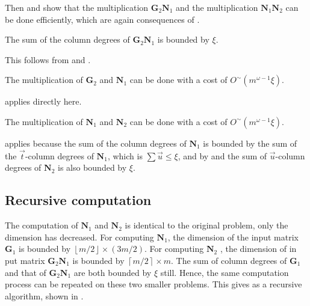 Then  and 
show that the multiplication $\mathbf{G}_{2}\mathbf{N}_{1}$ and the
multiplication $\mathbf{N}_{1}\mathbf{N}_{2}$ can be done efficiently,
which are again consequences of .
\begin{lem}
\label{lem:sizeOfG2N1}The sum of the column degrees of $\mathbf{G}_{2}\mathbf{N}_{1}$
is bounded by $\xi$.\end{lem}
\begin{pf}
This follows from 
and .\end{pf}
\begin{lem}
\label{lem:mutiplyingG2N1}The multiplication of $\mathbf{G}_{2}$
and $\mathbf{N}_{1}$ can be done with a cost of $O^{\sim}(m^{\omega-1}\xi)$.\end{lem}
\begin{pf}
 applies directly here.\end{pf}
\begin{lem}
\label{lem:multiplyingN1N2}The multiplication of $\mathbf{N}_{1}$
and $\mathbf{N}_{2}$ can be done with a cost of $O^{\sim}(m^{\omega-1}\xi)$.\end{lem}
\begin{pf}
 applies because the sum
of the column degrees of $\mathbf{N}_{1}$ is bounded by the sum of
the $\vec{t}$-column degrees of $\mathbf{N}_{1}$, which is $\sum\vec{u}\le\xi$,
and by  and 
the sum of $\vec{u}$-column degrees of $\mathbf{N}_{2}$ is also
bounded by $\xi$.
\end{pf}

\subsection{Recursive computation}

The computation of $\mathbf{N}_{1}$ and $\mathbf{N}_{2}$ is identical
to the original problem, only the dimension has decreased. For computing
$\mathbf{N}_{1}$, the dimension of the input matrix $\mathbf{G}_{1}$
is bounded by $\left\lfloor m/2\right\rfloor \times\left(3m/2\right)$.
For computing $\mathbf{N}_{2}$ , the dimension of in put matrix $\mathbf{G}_{2}\mathbf{N}_{1}$
is bounded by $\left\lceil m/2\right\rceil \times m$. The sum of
column degrees of $\mathbf{G}_{1}$ and that of $\mathbf{G}_{2}\mathbf{N}_{1}$
are both bounded by $\xi$ still. Hence, the same computation process
can be repeated on these two smaller problems. This gives as a recursive
algorithm, shown in . 



